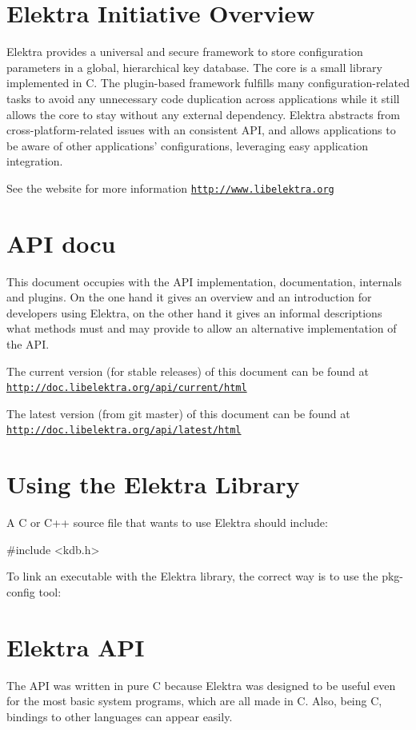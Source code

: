 \hypertarget{index_overview}{}\section{Elektra Initiative Overview}\label{index_overview}
Elektra provides a universal and secure framework to store configuration parameters in a global, hierarchical key database. The core is a small library implemented in C. The plugin-\/based framework fulfills many configuration-\/related tasks to avoid any unnecessary code duplication across applications while it still allows the core to stay without any external dependency. Elektra abstracts from cross-\/platform-\/related issues with an consistent A\-P\-I, and allows applications to be aware of other applications' configurations, leveraging easy application integration.

See the website for more information \href{http://www.libelektra.org}{\tt http\-://www.\-libelektra.\-org}\hypertarget{index_focus}{}\section{A\-P\-I docu}\label{index_focus}
This document occupies with the A\-P\-I implementation, documentation, internals and plugins. On the one hand it gives an overview and an introduction for developers using Elektra, on the other hand it gives an informal descriptions what methods must and may provide to allow an alternative implementation of the A\-P\-I.

The current version (for stable releases) of this document can be found at \href{http://doc.libelektra.org/api/current/html}{\tt http\-://doc.\-libelektra.\-org/api/current/html}

The latest version (from git master) of this document can be found at \href{http://doc.libelektra.org/api/latest/html}{\tt http\-://doc.\-libelektra.\-org/api/latest/html}\hypertarget{index_using}{}\section{Using the Elektra Library}\label{index_using}
A C or C++ source file that wants to use Elektra should include\-: 
\begin{DoxyCode}
\textcolor{preprocessor}{#include <kdb.h>}
\end{DoxyCode}


To link an executable with the Elektra library, the correct way is to use the {\ttfamily pkg-\/config} tool\-: 
\hypertarget{index_classes}{}\section{Elektra A\-P\-I}\label{index_classes}
The A\-P\-I was written in pure C because Elektra was designed to be useful even for the most basic system programs, which are all made in C. Also, being C, bindings to other languages can appear easily.

